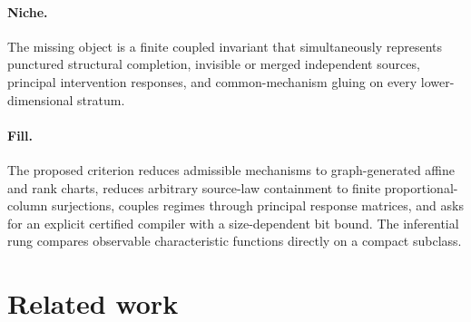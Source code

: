 \documentclass{article}
\begin{document}
\paragraph{Niche.} The missing object is a finite coupled invariant that simultaneously represents punctured structural completion, invisible or merged independent sources, principal intervention responses, and common-mechanism gluing on every lower-dimensional stratum.

\paragraph{Fill.} The proposed criterion reduces admissible mechanisms to graph-generated affine and rank charts, reduces arbitrary source-law containment to finite proportional-column surjections, couples regimes through principal response matrices, and asks for an explicit certified compiler with a size-dependent bit bound. The inferential rung compares observable characteristic functions directly on a compact subclass.

\section{Related work}
\end{document}
